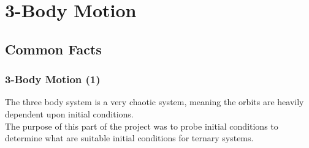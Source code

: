 \documentclass{beamer}
\begin{document}
\section{3-Body Motion}
\subsection{\tiny{Common Facts}}
\begin{frame}
\frametitle{3-Body Motion (1)}
The three body system is a very chaotic system, meaning the orbits are heavily dependent upon initial conditions. \\
\vspace{40pt}
The purpose of this part of the project was to probe initial conditions to determine what are suitable initial conditions for ternary systems.
\end{frame}
\end{document}
